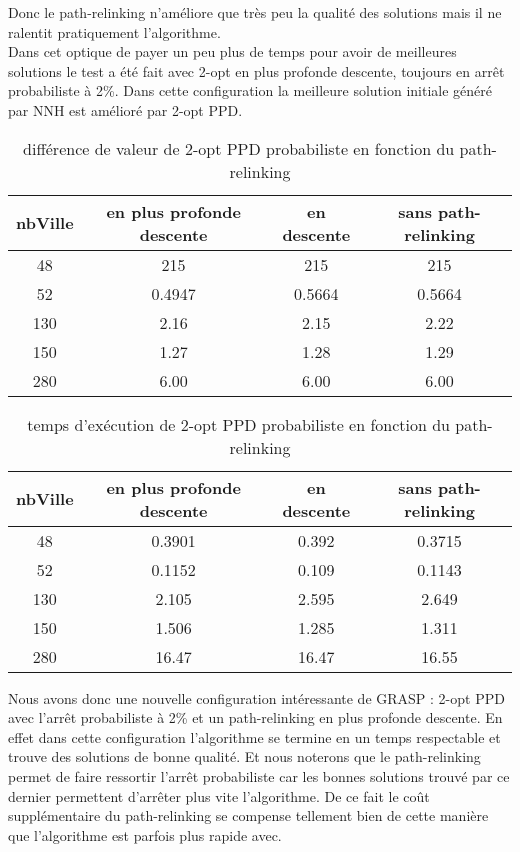 \documentclass[12pt,a4paper]{article}
\begin{document}
Donc le path-relinking n’améliore que très peu la qualité des solutions mais il ne ralentit pratiquement l'algorithme.\\

Dans cet optique de payer un peu plus de temps pour avoir de meilleures solutions le test a été fait avec 2-opt en plus profonde descente, toujours en arrêt probabiliste à 2\%. Dans cette configuration la meilleure solution initiale généré par NNH est amélioré par 2-opt PPD.\\

\begin{table}[!h]
\centering
\begin{tabular}{|*{4}{c|}}
\hline
nbVille & en plus profonde descente & en descente & sans path-relinking \\
\hline
48 & 215 & 215 & 215 \\
52 & 0.4947 & 0.5664 & 0.5664 \\
130 & 2.16 & 2.15 & 2.22 \\
150 & 1.27 & 1.28 & 1.29 \\
280 & 6.00 & 6.00 & 6.00 \\
\hline
\end{tabular}
\caption{différence de valeur de 2-opt PPD probabiliste en fonction du path-relinking}
\label{val2optPPDgraspPR}
\end{table}

\begin{table}[!h]
\centering
\begin{tabular}{|*{4}{c|}}
\hline
nbVille & en plus profonde descente & en descente & sans path-relinking \\
\hline
48 & 0.3901 & 0.392 & 0.3715 \\
52 & 0.1152 & 0.109 & 0.1143 \\
130 & 2.105 & 2.595 & 2.649 \\
150 & 1.506 & 1.285 & 1.311 \\
280 & 16.47 & 16.47 & 16.55 \\
\hline
\end{tabular}
\caption{temps d’exécution de 2-opt PPD probabiliste en fonction du path-relinking}
\label{temps2optPPDgraspPR}
\end{table}

Nous avons donc une nouvelle configuration intéressante de GRASP : 2-opt PPD avec l’arrêt probabiliste à 2\% et un path-relinking en plus profonde descente. En effet dans cette configuration l'algorithme se termine en un temps respectable et trouve des solutions de bonne qualité. Et nous noterons que le path-relinking permet de faire ressortir l’arrêt probabiliste car les bonnes solutions trouvé par ce dernier permettent d’arrêter plus vite l'algorithme. De ce fait le coût supplémentaire du path-relinking se compense tellement bien de cette manière que l'algorithme est parfois plus rapide avec.\\
\end{document}
